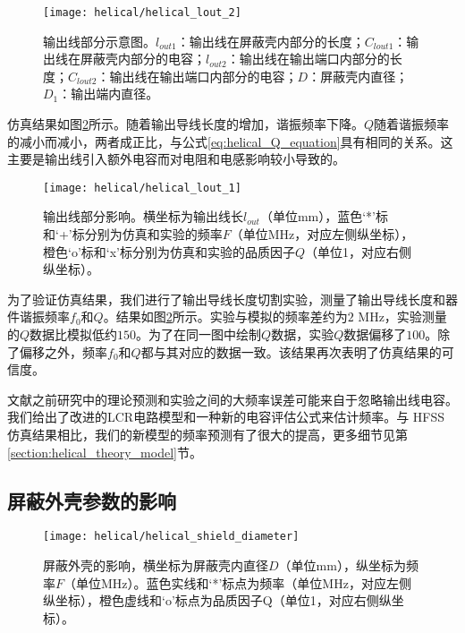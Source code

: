 \begin{figure}
    \centering
    \caption[输出线部分示意图]{输出线部分示意图。$l_{out1}$：输出线在屏蔽壳内部分的长度；$C_{lout1}$：输出线在屏蔽壳内部分的电容；$l_{out2}$：输出线在输出端口内部分的长度；$C_{lout2}$：输出线在输出端口内部分的电容；$D$：屏蔽壳内直径；$D_1$：输出端内直径。\label{fig:helical_lout_2}}
    \texttt{[image: helical/helical\_lout\_2]}
\end{figure}

仿真结果如图\ref{fig:helical_lout_1}所示。随着输出导线长度的增加，谐振频率下降。$Q$随着谐振频率的减小而减小，两者成正比，与公式\eqref{eq:helical_Q_equation}具有相同的关系。这主要是输出线引入额外电容而对电阻和电感影响较小导致的。

\begin{figure}
    \centering
    \caption[输出线部分影响]{输出线部分影响。横坐标为输出线长$l_{out}$（单位mm），蓝色‘*’标和‘+’标分别为仿真和实验的频率$F$（单位MHz，对应左侧纵坐标），橙色‘o’标和‘x’标分别为仿真和实验的品质因子$Q$（单位1，对应右侧纵坐标）。\label{fig:helical_lout_1}}
    \texttt{[image: helical/helical\_lout\_1]}
\end{figure}

为了验证仿真结果，我们进行了输出导线长度切割实验，测量了输出导线长度和器件谐振频率$f_0$和$Q$。结果如图\ref{fig:helical_lout_1}所示。实验与模拟的频率差约为$2$ MHz，实验测量的$Q$数据比模拟低约$150$。为了在同一图中绘制$ Q $数据，实验$ Q $数据偏移了$ 100$。除了偏移之外，频率$f_0$和$ Q $都与其对应的数据一致。该结果再次表明了仿真结果的可信度。

文献\cite[]{Gandolfi_Niedermayr_Kumph_Brownnutt_Blatt_2012,Macalpine_Schildknecht_1959, Deng_Sun_Yuan_Xu_Zhang_Lu_Luo_2014}之前研究中的理论预测和实验之间的大频率误差可能来自于忽略输出线电容\cite[]{Nandi_Sikdar_Das_Ray_2022, Batra_Panja_De_Roy_Majhi_Yadav_Sen_Gupta_2017}。我们给出了改进的LCR电路模型和一种新的电容评估公式来估计频率。与 HFSS 仿真结果相比，我们的新模型的频率预测有了很大的提高，更多细节见第\ref{section:helical_theory_model}节。

\subsection[屏蔽外壳参数的影响]{屏蔽外壳参数的影响}
\begin{figure}
    \centering
    \caption[屏蔽外壳的影响]{屏蔽外壳的影响，横坐标为屏蔽壳内直径$D$（单位mm），纵坐标为频率$F$（单位MHz）。蓝色实线和‘*’标点为频率（单位MHz，对应左侧纵坐标），橙色虚线和‘o’标点为品质因子Q（单位1，对应右侧纵坐标）。\label{fig:helical_shield_diameter}}
    \texttt{[image: helical/helical\_shield\_diameter]}
\end{figure}


